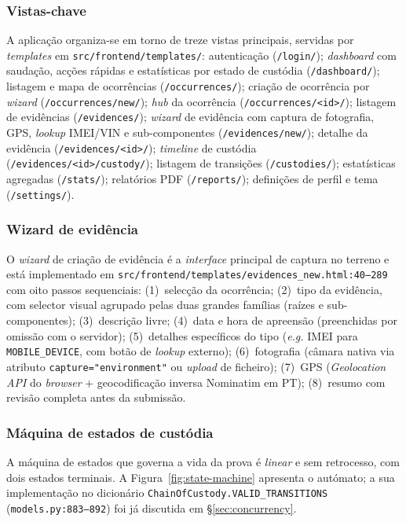 \subsubsection{Vistas-chave}
\label{sec:ui-views}

A aplicação organiza-se em torno de treze vistas principais,
servidas por \emph{templates} em \texttt{src/frontend/templates/}:
autenticação (\texttt{/login/}); \emph{dashboard} com saudação,
acções rápidas e estatísticas por estado de custódia
(\texttt{/dashboard/}); listagem e mapa de ocorrências
(\texttt{/occurrences/}); criação de ocorrência por \emph{wizard}
(\texttt{/occurrences/new/}); \emph{hub} da ocorrência
(\texttt{/occurrences/<id>/}); listagem de evidências
(\texttt{/evidences/}); \emph{wizard} de evidência com captura de
fotografia, GPS, \emph{lookup} IMEI/VIN e sub-componentes
(\texttt{/evidences/new/}); detalhe da evidência
(\texttt{/evidences/<id>/}); \emph{timeline} de custódia
(\texttt{/evidences/<id>/custody/}); listagem de transições
(\texttt{/custodies/}); estatísticas agregadas (\texttt{/stats/});
relatórios PDF (\texttt{/reports/}); definições de perfil e tema
(\texttt{/settings/}).

\subsubsection{Wizard de evidência}
\label{sec:wizard}

O \emph{wizard} de criação de evidência é a \emph{interface}
principal de captura no terreno e está implementado em
\texttt{src/frontend/templates/evidences\_new.html:40--289} com
oito passos sequenciais: (1)~selecção da ocorrência; (2)~tipo da
evidência, com selector visual agrupado pelas duas grandes famílias
(raízes e sub-componentes); (3)~descrição livre; (4)~data e hora de
apreensão (preenchidas por omissão com o servidor);
(5)~detalhes específicos do tipo (\emph{e.g.} IMEI para
\texttt{MOBILE\_DEVICE}, com botão de \emph{lookup} externo);
(6)~fotografia (câmara nativa via atributo \texttt{capture="environment"}
ou \emph{upload} de ficheiro);
(7)~GPS (\emph{Geolocation API} do \emph{browser} + geocodificação
inversa Nominatim em PT); (8)~resumo com revisão completa antes da
submissão.

\subsubsection{Máquina de estados de custódia}
\label{sec:state-machine}

A máquina de estados que governa a vida da prova é \emph{linear} e
sem retrocesso, com dois estados terminais. A
Figura~\ref{fig:state-machine} apresenta o autómato; a sua
implementação no dicionário \texttt{ChainOfCustody.VALID\_TRANSITIONS}
(\texttt{models.py:883--892}) foi já discutida em
\S\ref{sec:concurrency}.

